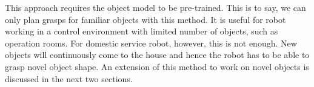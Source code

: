 This approach requires the object model to be pre-trained. This is to say, we can only plan grasps for familiar objects with this method. It is useful for robot working in a control environment with limited number of objects, such as operation rooms. For domestic service robot, however, this is not enough. New objects will continuously come to the house and hence the robot has to be able to grasp novel object shape. An extension of this method to work on novel objects is discussed in the next two sections.



